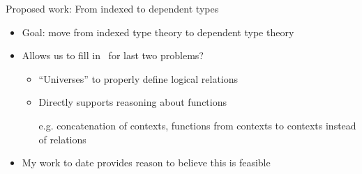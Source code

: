 \documentclass[usenames,dvipsnames]{beamer}
\begin{document}
\begin{frame}{Proposed work: From indexed to dependent types}
\begin{itemize}
\item Goal: move from indexed type theory to dependent type theory
\item Allows us to fill in \good $\,$ for last two problems?
\begin{itemize}
\item ``Universes'' to properly define logical relations
\item Directly supports reasoning about functions

 e.g. concatenation of contexts, functions from contexts to contexts instead of relations
\end{itemize}
\item My work to date provides reason to believe this is feasible

\end{itemize}
\end{frame}

\end{document}

